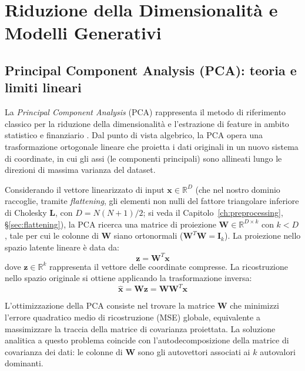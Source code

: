 \chapter{Riduzione della Dimensionalità e Modelli Generativi}
\label{ch:modelli_generativi}

\section{Principal Component Analysis (PCA): teoria e limiti lineari}
\label{sec:pca}

La \emph{Principal Component Analysis} (PCA) rappresenta il metodo di riferimento classico per la riduzione della dimensionalità e l'estrazione di feature in ambito statistico e finanziario \citep{jolliffe2016pca}. Dal punto di vista algebrico, la PCA opera una trasformazione ortogonale lineare che proietta i dati originali in un nuovo sistema di coordinate, in cui gli assi (le componenti principali) sono allineati lungo le direzioni di massima varianza del dataset.

Considerando il vettore linearizzato di input $\mathbf{x} \in \mathbb{R}^D$ (che nel nostro dominio raccoglie, tramite \emph{flattening}, gli elementi non nulli del fattore triangolare inferiore di Cholesky $\mathbf{L}$, con $D = N(N+1)/2$; si veda il Capitolo~\ref{ch:preprocessing}, \S\ref{sec:flattening}), la PCA ricerca una matrice di proiezione $\mathbf{W} \in \mathbb{R}^{D \times k}$ con $k < D$, tale per cui le colonne di $\mathbf{W}$ siano ortonormali ($\mathbf{W}^T \mathbf{W} = \mathbf{I}_k$). La proiezione nello spazio latente lineare è data da:
\begin{equation}
\mathbf{z} = \mathbf{W}^T \mathbf{x}
\end{equation}
dove $\mathbf{z} \in \mathbb{R}^k$ rappresenta il vettore delle coordinate compresse. La ricostruzione nello spazio originale si ottiene applicando la trasformazione inversa:
\begin{equation}
\mathbf{\hat{x}} = \mathbf{W} \mathbf{z} = \mathbf{W} \mathbf{W}^T \mathbf{x}
\end{equation}

L'ottimizzazione della PCA consiste nel trovare la matrice $\mathbf{W}$ che minimizzi l'errore quadratico medio di ricostruzione (MSE) globale, equivalente a massimizzare la traccia della matrice di covarianza proiettata. La soluzione analitica a questo problema coincide con l'autodecomposizione della matrice di covarianza dei dati: le colonne di $\mathbf{W}$ sono gli autovettori associati ai $k$ autovalori dominanti.

